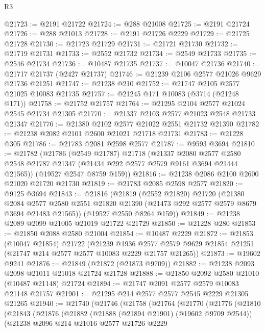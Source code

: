 \begin{lexlean}{R3}
\begin{coremodule}
@21723 := @2191 @21722
@21724 := @288 @21008
@21725 := @2191 @21724
@21726 := @288 @21013
@21728 := @2191 @21726 @2229
@21729 := @21725 @21728
@21730 := @21723 @21729
@21731 := @21721 @21730
@21732 := @21719 @21731
@21733 := @2552 @21732
@21734 := @2549 @21733
@21735 := @2546 @21734
@21736 := @10487 @21735
@21737 := @10047 @21736
@21740 := @21717 @21737 (@2427 @21737)
@21746 := @21239 @2106 @2577 @21026 @9629 @21736 @21251
@21747 := @21238 @210
@21752 := @21747 @2105 @2577 @21025 @10083 @21735
@21757 := @21245 @171 @10083 (@3714 (@21248 @171))
@21758 := @21752 @21757
@21764 := @21295 @2104 @2577 @21024 @2545 @21734 @21305
@21770 := @21337 @2103 @2577 @21023 @2548 @21733 @21347
@21776 := @21380 @2102 @2577 @21022 @2551 @21732 @21390
@21782 := @21238 @2082 @2101 @2600 @21021 @21718 @21731
@21783 := @21228 @305
@21786 := @21783 @2081 @2598 @2577
@21787 := @9593 @3694
@21810 := @21782
    (@21786
      (@2549 @21787)
      @21718
      (@21337
        @2080
        @2577
        @2580
        @2548
        @21787
        @21347
        (@21434 @292 @2577 @2579 @9161 @3694 @21444 @21565))
      (@19527 @2547 @8759 @159))
@21816 := @21238 @2086 @2100 @2600 @21020 @21720 @21730
@21819 := @21783 @2085 @2598 @2577
@21820 := @9125 @3694
@21843 := @21816
    (@21819
      (@2552 @21820)
      @21720
      (@21380
        @2084
        @2577
        @2580
        @2551
        @21820
        @21390
        (@21473 @292 @2577 @2579 @8679 @3694 @21483 @21565))
      (@19527 @2550 @8264 @159))
@21849 := @21238 @2089 @2099 @21005 @21019 @21722 @21729
@21850 := @21228 @280
@21853 := @21850 @2088 @2580 @21004
@21854 := @10487 @2229
@21872 := @21853
    (@10047 @21854)
    @21722
    (@21239
      @1936
      @2577
      @2579
      @9629
      @21854
      @21251
      (@21747 @214 @2577 @2577 @10083 @2229 @21757 @21265))
@21873 := @19602 @9241
@21876 := @21849 (@21872 (@21873 @9709))
@21882 := @21238 @2093 @2098 @21011 @21018 @21724 @21728
@21888 := @21850 @2092 @2580 @21010 (@10487 @21148) @21724
@21894 := @21747 @2091 @2577 @2579 @10083 @21148 @21757
@21901 := @21295 @214 @2577 @2577 @2545 @2229 @21305 @21265
@21940 := @21740
    (@21746
      (@21758
        (@21764
          (@21770
            (@21776
              (@21810
                (@21843
                  (@21876
                    (@21882
                      (@21888 (@21894 @21901) (@19602 @9709 @2544))
                      (@21238
                        @2096
                        @214
                        @21016
                        @2577
                        @21726
                        @2229

\end{coremodule}
\end{lexlean}
